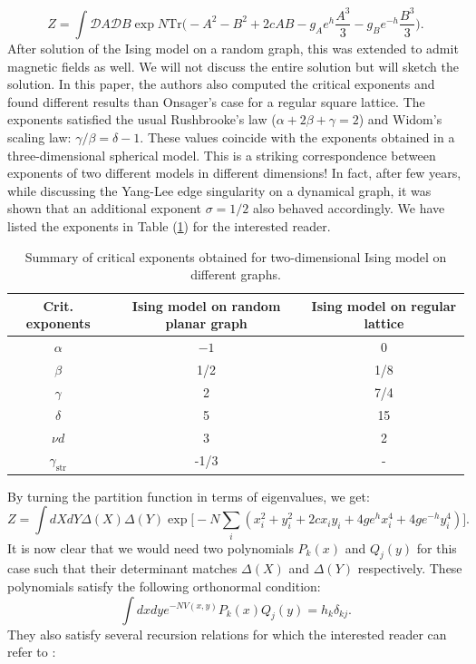 \documentclass[letter,11pt]{article}
\begin{document}
\begin{equation}
	\label{eq:RIsing1} 
	Z = \int \mathcal{D}A \mathcal{D}B \exp N \mbox{Tr} \Bigg(-A^2 -B^2 + 2c AB -g_{A}e^{h} \frac{A^3}{3} 
	- g_{B}e^{-h} \frac{B^3}{3}  \Bigg). 
\end{equation}
After solution of the Ising model on a random graph, this was extended to admit magnetic fields
\cite{Boulatov:1986sb} as well. We will not discuss the entire solution but will 
sketch the solution. In this paper, the authors also computed the critical exponents 
and found different results than Onsager's case for a regular square lattice. 
The exponents satisfied the usual Rushbrooke's law ($\alpha + 2\beta+\gamma=2$) 
and Widom's scaling law: $\gamma/\beta = \delta -1$. 
These values coincide with the exponents obtained in a three-dimensional spherical model. 
This is a striking correspondence between exponents of two different models in different dimensions! In fact, after few years, while discussing the Yang-Lee edge singularity on a dynamical graph, it was shown that an additional exponent $\sigma =1/2$ 
also behaved accordingly. We have listed the exponents in Table (\ref{table:crit_exp}) for the interested reader.
\begin{table} 
	\begin{center} 
\begin{tabular}{|c|c|c|}
	\hline Crit. exponents & Ising model on random planar graph & Ising model on regular lattice \\
	\hline$\alpha$ & $-1$ & 0 \\
	$\beta$ & 1/2 & 1/8 \\
	$\gamma$ & 2 & 7/4 \\
	$\delta$ & 5 & 15 \\
	$\nu d$ & 3 & 2 \\
	$\gamma_{\text {str}}$ & -1/3 & - \\
	\hline
\end{tabular}
\end{center} 
	\caption{Summary of critical exponents obtained for two-dimensional Ising model on different graphs.} 
	\label{table:crit_exp}
	\end{table} 
By turning the partition function in terms of eigenvalues, we get:
\begin{equation}
	Z = \int dX dY \Delta(X) \Delta(Y)
	 \exp \Big[-N \sum_{i} (x_{i}^2 + y_{i}^{2} +2c x_{i}y_{i} + 4ge^{h}x_{i}^{4} + 4ge^{-h}y_{i}^4) \Big].
	\end{equation}
It is now clear that we would need two polynomials $P_{k}(x)$ and $Q_{j}(y)$ for this case 
such that their determinant matches $\Delta(X)$ and $\Delta(Y)$ respectively. 
These polynomials satisfy the following orthonormal condition: 
\begin{equation}
\int dx dy e^{-N V(x,y)} P_{k}(x) Q_{j}(y) = h_{k} \delta_{kj}. 
\end{equation}
They also satisfy several recursion relations for which the interested reader can refer to 
\cite{Boulatov:1986sb}:
\end{document}
